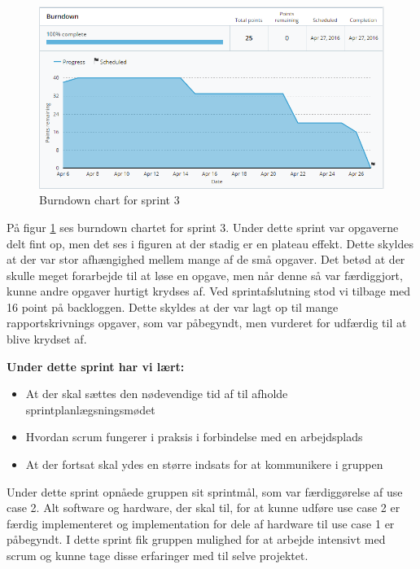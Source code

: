 \documentclass[a4paper,oneside,article]{memoir}
\begin{document}
	\begin{figure}[H]
		\centering
		\includegraphics[width=\textwidth]{Projektgennemfoerelse/images/burndown3}
		\caption{Burndown chart for sprint 3}
		\label{ref:Burndown3}
	\end{figure}
	
	På figur \ref{ref:Burndown3} ses burndown chartet for sprint 3. Under dette sprint var opgaverne delt fint op, men det ses i figuren at der stadig er en plateau effekt. Dette skyldes at der var stor afhængighed mellem mange af de små opgaver. Det betød at der skulle meget forarbejde til at løse en opgave, men når denne så var færdiggjort, kunne andre opgaver hurtigt krydses af. Ved sprintafslutning stod vi tilbage med 16 point på backloggen. Dette skyldes at der var lagt op til mange rapportskrivnings opgaver, som var påbegyndt, men vurderet for udfærdig til at blive krydset af. \newline
	
	\textbf{Under dette sprint har vi lært:}
	\begin{itemize}
		\item At der skal sættes den nødevendige tid af til afholde sprintplanlægsningsmødet
		\item Hvordan scrum fungerer i praksis i forbindelse med en arbejdsplads
		\item At der fortsat skal ydes en større indsats for at kommunikere i gruppen
	\end{itemize}
	
	Under dette sprint opnåede gruppen sit sprintmål, som var færdiggørelse af use case 2. Alt software og hardware, der skal til, for at kunne udføre use case 2 er færdig implementeret og implementation for dele af hardware til use case 1 er påbegyndt. I dette sprint fik gruppen mulighed for at arbejde intensivt med scrum og kunne tage disse erfaringer med til selve projektet. 
	
\end{document}

